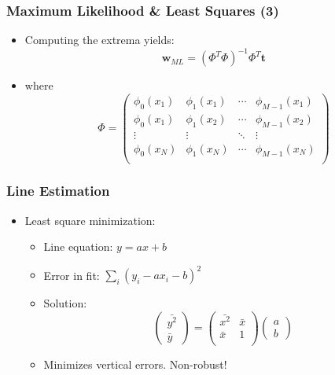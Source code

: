 \documentclass[10pt]{beamer}
\begin{document}
\begin{frame}
  \frametitle{Maximum Likelihood \& Least Squares (3)}
  \begin{itemize}
  \item Computing the extrema yields:
    \[
    {\mathbf w}_{ML} = \left( \Phi^T \Phi \right)^{-1} \Phi^T
    {\mathbf t}
    \]
  \item where
    \[
    \Phi = \left(
      \begin{array}{cccc}
        \phi_0(x_1) & \phi_1(x_1) & \cdots & \phi_{M-1}(x_1) \\
        \phi_0(x_1) & \phi_1(x_2) & \cdots & \phi_{M-1}(x_2) \\
        \vdots      & \vdots      & \ddots & \vdots         \\
        \phi_0(x_N) & \phi_1(x_N) & \cdots & \phi_{M-1}(x_N) \\
      \end{array}
    \right)
    \]
  \end{itemize}
\end{frame}

\begin{frame}
  \frametitle{Line Estimation}
  \begin{itemize}
  \item Least square minimization:
    \begin{itemize}\setlength{\itemsep}{0pt}
    \item Line equation: $y=a x + b$
    \item Error in fit: $\sum_i (y_i - a x_i - b)^2$
    \item Solution: \[ 
      \left( \begin{array}{c} \bar{y^2}\\ \bar{y} \end{array}
      \right) = \left( \begin{array}{cc} 
          \bar{x^2} & \bar{x} \\
          \bar{x}   & 1\\ \end{array} \right) \left( 
        \begin{array}{c} a \\ b \end{array} \right)
      \]
    \item Minimizes vertical errors. Non-robust!
    \end{itemize}
  \end{itemize}  
\end{frame}
\end{document}
